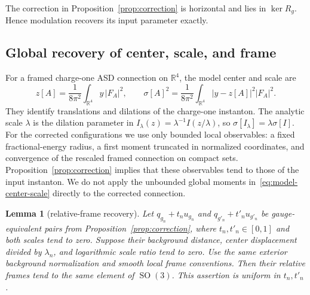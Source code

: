 \documentclass[11pt]{amsart}
\newtheorem{lemma}[theorem]{Lemma}
\theoremstyle{definition}
\theoremstyle{remark}
\theoremstyle{plain}
\newcommand{\RR}{\mathbb{R}}
\newcommand{\SO}{\operatorname{SO}}
\begin{document}
The correction in Proposition~\ref{prop:correction} is horizontal and lies
in $\ker R_g$.  Hence modulation recovers its input parameter exactly.

\subsection{Global recovery of center, scale, and frame}
For a framed charge-one ASD connection on $\RR^4$, the model center
and scale are
\begin{equation}\label{eq:model-center-scale}
 z[A]=\frac{1}{8\pi^2}\int_{\RR^4}y\,|F_A|^2,
 \qquad
 \sigma[A]^2=\frac{1}{8\pi^2}
 \int_{\RR^4}|y-z[A]|^2|F_A|^2.
\end{equation}
They identify translations and dilations of the charge-one instanton.
The analytic scale $\lambda$ is the dilation parameter in
$I_\lambda(z)=\lambda^{-1}I(z/\lambda)$, so
$\sigma[I_\lambda]=\lambda\sigma[I]$.
For
the corrected configurations we use only bounded local observables: a fixed
fractional-energy radius, a first moment truncated in normalized
coordinates, and convergence of the rescaled framed connection on compact
sets.  Proposition~\ref{prop:correction} implies that these observables tend
to those of the input instanton.  We do not apply the unbounded global
moments in~\eqref{eq:model-center-scale} directly to the corrected
connection.

\begin{lemma}[relative-frame recovery]
\label{lem:outer-frame}
Let $q_{g_n}+t_nu_{g_n}$ and $q_{g'_n}+t'_nu_{g'_n}$ be gauge-equivalent
pairs from Proposition~\ref{prop:correction}, where $t_n,t'_n\in[0,1]$
and both scales tend to zero.  Suppose their background distance,
center displacement divided by $\lambda_n$, and logarithmic scale ratio
tend to zero.  Use the same exterior background normalization and smooth
local frame conventions.  Then their relative frames tend to the same
element of $\SO(3)$.  This assertion is uniform in $t_n,t'_n$.
\end{lemma}
\end{document}
